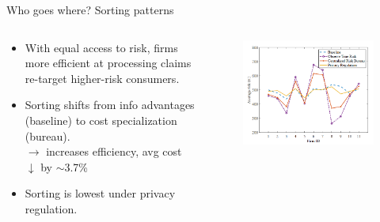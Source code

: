 \documentclass[10pt,aspectratio=169]{beamer}
\begin{document}
\begin{frame}{Who goes where? Sorting patterns}
\begin{columns}[t]
\begin{column}{0.44\textwidth}
\begin{itemize}
  \item With equal access to risk, firms more efficient at processing claims re-target higher-risk consumers.
  \item Sorting shifts from info advantages (baseline) to cost specialization (bureau). \\
  $\rightarrow$ increases efficiency, avg cost $\downarrow$ by $\sim$3.7\% 
  \item Sorting is lowest under privacy regulation. 
\end{itemize}
\end{column}
\begin{column}{0.51\textwidth}
\vspace{-0.3cm}
\begin{figure}[H]
\centering
\includegraphics[width=\textwidth]{Figures/Fig6.png}
\end{figure}
\end{column}
\end{columns}
\end{frame}
\end{document}
